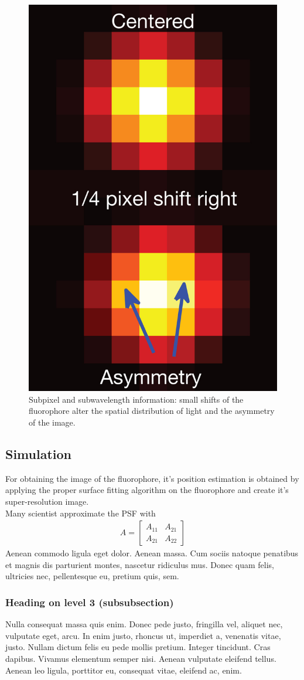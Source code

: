 \documentclass[paper=a4, fontsize=11pt]{scrartcl}
\numberwithin{equation}{section}		%
\numberwithin{figure}{section}			%
\numberwithin{table}{section}				%
\begin{document}
\begin{figure}[h]
\centering
\includegraphics[width=.5\textwidth]{nmeth_2844-F1}
\caption{Subpixel and subwavelength information: small shifts of the fluorophore alter the spatial distribution of light and the asymmetry of the image.}
\end{figure}

\subsection{Simulation}
For obtaining the image of the fluorophore, it's position estimation is obtained by applying the proper surface fitting algorithm on the fluorophore and create it's super-resolution image.\\
Many scientist approximate the PSF with 
\begin{align}
	A = 
	\begin{bmatrix}
	A_{11} & A_{21} \\
  	A_{21} & A_{22}
	\end{bmatrix}
\end{align}
Aenean commodo ligula eget dolor. Aenean massa. Cum sociis natoque penatibus et magnis dis parturient montes, nascetur ridiculus mus. Donec quam felis, ultricies nec, pellentesque eu, pretium quis, sem.

\subsubsection{Heading on level 3 (subsubsection)}
Nulla consequat massa quis enim. Donec pede justo, fringilla vel, aliquet nec, vulputate eget, arcu. In enim justo, rhoncus ut, imperdiet a, venenatis vitae, justo. Nullam dictum felis eu pede mollis pretium. Integer tincidunt. Cras dapibus. Vivamus elementum semper nisi. Aenean vulputate eleifend tellus. Aenean leo ligula, porttitor eu, consequat vitae, eleifend ac, enim.
\end{document}
